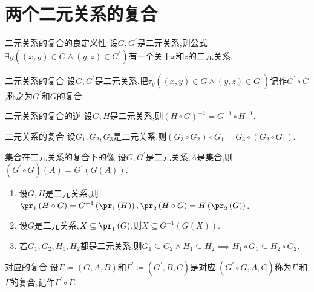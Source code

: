 \section{两个二元关系的复合}

\begin{lemma}{二元关系的复合的良定义性}{}
	设$G,G^{\prime}$是二元关系,则公式$\exists y\left(\left(x,y\right)\in G\wedge\left(y,z\right)\in G^{\prime}\right)$有一个关于$x$和$z$的二元关系.
\end{lemma}

\begin{definition}{二元关系的复合}{}
	设$G,G^{\prime}$是二元关系.把$\tau_{y}\left(\left(x,y\right)\in G\wedge\left(y,z\right)\in G^{\prime}\right)$记作$G^{\prime}\circ G$,称之为$G^{\prime}$和$G$的复合.
\end{definition}

\begin{proposition}{二元关系的复合的逆}{}
	设$G,H$是二元关系,则$\left(H\circ G\right)^{-1}=G^{-1}\circ H^{-1}$.
\end{proposition}

\begin{proposition}{二元关系的复合}{}
	设$G_{1},G_{2},G_{3}$是二元关系,则$\left(G_{3}\circ G_{2}\right)\circ G_{1}=G_{3}\circ\left(G_{2}\circ G_{1}\right)$.
\end{proposition}

\begin{proposition}{集合在二元关系的复合下的像}{}
	设$G,G^{\prime}$是二元关系,$A$是集合,则$\left(G^{\prime}\circ G\right)\left(A\right)=G^{\prime}\left(G\left(A\right)\right)$.
\end{proposition}

\begin{proposition}{}{}
	\begin{enumerate}
		\item 设$G,H$是二元关系,则$\pr_{1}\left(H\circ G\right)=G^{-1}\left(\pr_{1}\left(H\right)\right),\pr_{2}\left(H\circ G\right)=H\left(\pr_{2}\left(G\right)\right)$.
		\item 设$G$是二元关系,$X\subseteq\pr_{1}\left(G\right)$,则$X\subseteq G^{-1}\left(G\left(X\right)\right)$.
		\item 若$G_{1},G_{2},H_{1},H_{2}$都是二元关系,则$G_{1}\subseteq G_{2}\wedge H_{1}\subseteq H_{2}\implies H_{1}\circ G_{1}\subseteq H_{2}\circ G_{2}$.
	\end{enumerate}
\end{proposition}

\begin{definition}{对应的复合}{}
	设$\Gamma\coloneq\left(G,A,B\right)$和$\Gamma^{\prime}\coloneq\left(G^{\prime},B,C\right)$是对应.$\left(G^{\prime}\circ G,A,C\right)$称为$\Gamma^{\prime}$和$\Gamma$的复合,记作$\Gamma^{\prime}\circ\Gamma$.
\end{definition}

